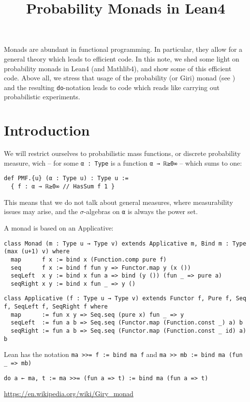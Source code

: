 \documentclass{article}
\theoremstyle{definition}
\theoremstyle{step} \newtheorem{step}{Step}
\newcommand{\leanline}[1]{\texttt{#1}}%
\begin{document}
\title{\LARGE Probability Monads in Lean4}


\maketitle 

Monads are abundant in functional programming. In particular, they allow for a general theory which leads to efficient code. In this note, we shed some light on probability monads in Lean4 (and Mathlib4), and show some of this efficient code. Above all, we stress that usage of the probability (or Giri) monad (see \citealp{giry2006categorical}) and the resulting \leanline{do}-notation leads to code which reads like carrying out probabilistic experiments. 

\section{Introduction}
We will restrict ourselves to probabilistic mass functions, or discrete probability measure, wich -- for some \leanline{α : Type} is a function \leanline{α → ℝ≥0∞} -- which sums to one:

\begin{verbatim}
def PMF.{u} (α : Type u) : Type u :=
  { f : α → ℝ≥0∞ // HasSum f 1 }
\end{verbatim}

This means that we do not talk about general measures, where measurability issues may arise, and the $\sigma$-algebras on \leanline{α} is always the power set. 

A monad is based on an Applicative:

\begin{verbatim}
class Monad (m : Type u → Type v) extends Applicative m, Bind m : Type (max (u+1) v) where
  map      f x := bind x (Function.comp pure f)
  seq      f x := bind f fun y => Functor.map y (x ())
  seqLeft  x y := bind x fun a => bind (y ()) (fun _ => pure a)
  seqRight x y := bind x fun _ => y ()
\end{verbatim}


\begin{verbatim}
class Applicative (f : Type u → Type v) extends Functor f, Pure f, Seq f, SeqLeft f, SeqRight f where
  map      := fun x y => Seq.seq (pure x) fun _ => y
  seqLeft  := fun a b => Seq.seq (Functor.map (Function.const _) a) b
  seqRight := fun a b => Seq.seq (Functor.map (Function.const _ id) a) b
\end{verbatim}

Lean has the notation \leanline{ma >>= f := bind  ma f} and \leanline{ma >> mb := bind ma (fun _ => mb)}

\leanline{do a ← ma, t :=  ma >>= (fun a => t) := bind ma (fun a => t)}



\url{https://en.wikipedia.org/wiki/Giry_monad}

\cite{giry2006categorical}



\end{document}
